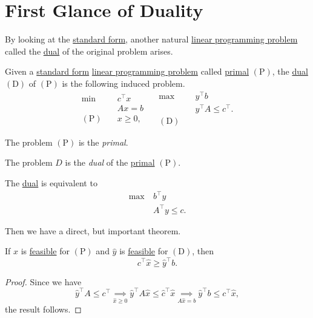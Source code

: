 \section{First Glance of Duality}
By looking at the \hyperref[def:standard-form]{standard form}, another natural \hyperref[def:general-linear-programming-problem]{linear programming problem} called the \hyperref[def:dual]{dual} of the original problem arises.
\begin{definition}
	Given a \hyperref[def:standard-form]{standard form} \hyperref[def:general-linear-programming-problem]{linear programming problem} called \hyperref[def:primal]{primal} \((\mathrm{P})\), the \hyperref[def:dual]{dual} \((\mathrm{D})\) of \((\mathrm{P})\) is the following induced problem.
	\[
		\begin{aligned}
			\min~             & c^{\top}x \\
			                  & Ax = b    \\
			(\mathrm{P})\quad & x\geq  0,
		\end{aligned}\quad \begin{aligned}
			\max ~            & y^{\top}b               \\
			                  & y^{\top}A\leq c^{\top}. \\
			(\mathrm{D})\quad &
		\end{aligned}
	\]
	\begin{definition}[Primal]\label{def:primal}
		The problem \((\mathrm{P})\) is the \emph{primal}.
	\end{definition}

	\begin{definition}[Dual]\label{def:dual}
		The problem \(D\) is the \emph{dual} of the \hyperref[def:primal]{primal} \((\mathrm{P})\).
	\end{definition}
\end{definition}

\begin{note}
	The \hyperref[def:dual]{dual} is equivalent to
	\[
		\begin{aligned}
			\max~ & b^{\top}y         \\
			      & A^{\top}y \leq c.
		\end{aligned}
	\]
\end{note}

Then we have a direct, but important theorem.
\begin{theorem}\label{thm:weak-duality}
	If \(\hat{x}\) is \hyperref[def:feasible-solution]{feasible} for \((\mathrm{P})\) and \(\hat{y}\) is \hyperref[def:feasible-solution]{feasible} for \((\mathrm{D})\), then
	\[
		c^{\top}\hat{x} \geq  \hat{y}^{\top} b.
	\]
\end{theorem}
\begin{proof}
	Since we have
	\[
		\hat{y}^{\top}A\leq c^{\top} \underset{\hat{x}\geq 0}{\implies} \hat{y}^{\top}A \hat{x} \leq \hat{c}^{\top} \hat{x} \underset{A \hat{x} = b}{\implies} \hat{y}^{\top}b \leq c^{\top} \hat{x},
	\]
	the result follows.
\end{proof}


